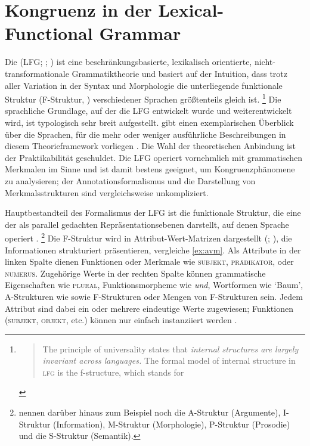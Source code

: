 \section{Kongruenz in der Lexical-Functional Grammar}
\label{sec:lfgkongr}

Die  (LFG;
\cites{kaplanbresnan1982,bresnan2001,bresnanetal2016}; \cites[zur Einführung
z.\,B.][]{buttking2015}[Kapitel~7]{mueller2020}) ist eine
beschränkungsbasierte, lexikalisch orientierte,
nicht-trans\allowbreak{}formationale Grammatiktheorie und basiert auf der
Intuition, dass trotz aller Variation in der Syntax und Morphologie die
unterliegende funktionale Struktur (F-Struktur,
) verschiedener Sprachen größtenteils gleich ist.%
%
	\footnote{\foreignblockcquote{english}[42]{bresnanetal2016}{The principle
		of universality states that \emph{internal structures are largely
		invariant across languages.} The formal model of internal structure in
		\textsc{lfg} is the f-structure, which stands for }.%
	}
%
Die sprachliche Grundlage, auf der die LFG entwickelt wurde und
weiterentwickelt wird, ist typologisch sehr breit aufgestellt.
\citet[221--222]{mueller2020} gibt einen exemplarischen Überblick über die
Sprachen, für die mehr oder weniger ausführliche Beschreibungen in diesem
Theorieframework vorliegen \autocites[zum modernen Standarddeutschen
vgl.][]{berman2003}{fortmann2006}. Die Wahl der theoretischen Anbindung ist der
Praktikabilität geschuldet. Die LFG operiert vornehmlich mit grammatischen
Merkmalen im Sinne  und ist damit bestens geeignet, um
Kongruenzphänomene zu analysieren; der Annotationsformalismus und die
Darstellung von Merkmalsstrukturen sind vergleichsweise unkompliziert.

Hauptbestandteil des Formalismus der LFG ist die funktionale Struktur, die eine
der als parallel gedachten Repräsentationsebenen darstellt, auf denen Sprache
operiert \autocite[840--844]{buttking2015}.%
%
	\footnote{\citet[862--865]{buttking2015} nennen darüber hinaus zum Beispiel
		noch die
		A-Struktur (Argumente),
		I-Struktur (Information),
		M-Struktur (Morphologie),
		P-Struktur (Prosodie)
		und die
		S-Struktur (Semantik).
	}
%
Die F-Struktur wird in Attribut-Wert-Matrizen dargestellt (; \cites[vgl.][44--45]{bresnanetal2016}[Kap.~6]{mueller2020}), die
Informationen strukturiert präsentieren, vergleiche \cref{ex:avm}. Als
Attribute in der linken Spalte dienen Funktionen oder Merkmale wie
\textsc{subjekt}, \textsc{prädikator}, oder \textsc{numerus}.
Zugehörige Werte in der rechten Spalte können grammatische Eigenschaften wie
\textsc{plural}, Funktionsmorpheme wie \textit{und}, Wortformen wie
`Baum', A-Strukturen wie  sowie F-Strukturen oder Mengen von F-Strukturen sein. Jedem
Attribut sind dabei ein oder mehrere eindeutige Werte zugewiesen; Funktionen
(\textsc{subjekt}, \textsc{objekt}, etc.) können nur einfach
instanziiert werden \autocite[vgl.][44--58]{bresnanetal2016}.

